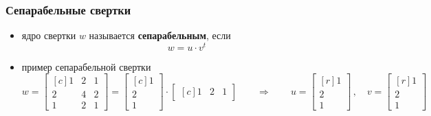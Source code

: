 \documentclass[
    12pt, 
    usepdftitle=false,
    aspectratio=1610
]{beamer}
\begin{document}
\begin{frame}
\frametitle{Сепарабельные свертки}
\begin{itemize}
    \item ядро свертки $w$ называется \textbf{сепарабельным}, если
    $$
        w = u \cdot v^t
    $$
    \item пример сепарабельной свертки
        $$
            w = 
            \begin{bmatrix*}[c]
                1 & 2 & 1\\
                2 & 4 & 2\\
                1 & 2 & 1
            \end{bmatrix*}=
            \begin{bmatrix*}[c]
                1 \\ 2\\ 1
            \end{bmatrix*}\cdot
            \begin{bmatrix*}[c]
                1 & 2 & 1
            \end{bmatrix*}
            \qquad\Rightarrow\qquad
            u =
            \begin{bmatrix*}[r]
                1 \\ 2\\ 1
            \end{bmatrix*}\,,\quad
            v =
            \begin{bmatrix*}[r]
                1 \\ 2\\ 1
            \end{bmatrix*}
        $$
\end{itemize}
\end{frame}
\end{document}
